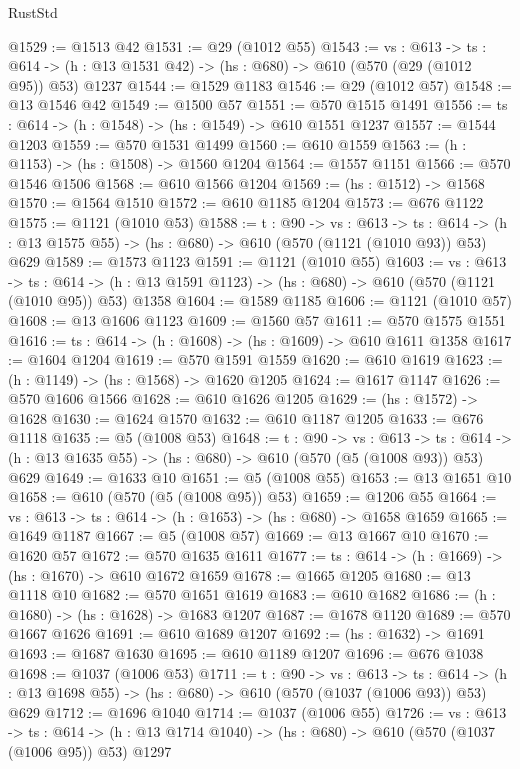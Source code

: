\begin{lexlean}{RustStd}
\begin{coremodule}
@1529 := @1513 @42
@1531 := @29 (@1012 @55)
@1543 := {vs : @613} ->
  {ts : @614} -> (h : @13 @1531 @42) -> (hs : @680) -> @610 (@570 (@29 (@1012 @95)) @53) @1237
@1544 := @1529 @1183
@1546 := @29 (@1012 @57)
@1548 := @13 @1546 @42
@1549 := @1500 @57
@1551 := @570 @1515 @1491
@1556 := {ts : @614} -> (h : @1548) -> (hs : @1549) -> @610 @1551 @1237
@1557 := @1544 @1203
@1559 := @570 @1531 @1499
@1560 := @610 @1559
@1563 := (h : @1153) -> (hs : @1508) -> @1560 @1204
@1564 := @1557 @1151
@1566 := @570 @1546 @1506
@1568 := @610 @1566 @1204
@1569 := (hs : @1512) -> @1568
@1570 := @1564 @1510
@1572 := @610 @1185 @1204
@1573 := @676 @1122
@1575 := @1121 (@1010 @53)
@1588 := {t : @90} ->
  {vs : @613} ->
  {ts : @614} -> (h : @13 @1575 @55) -> (hs : @680) -> @610 (@570 (@1121 (@1010 @93)) @53) @629
@1589 := @1573 @1123
@1591 := @1121 (@1010 @55)
@1603 := {vs : @613} ->
  {ts : @614} -> (h : @13 @1591 @1123) -> (hs : @680) -> @610 (@570 (@1121 (@1010 @95)) @53) @1358
@1604 := @1589 @1185
@1606 := @1121 (@1010 @57)
@1608 := @13 @1606 @1123
@1609 := @1560 @57
@1611 := @570 @1575 @1551
@1616 := {ts : @614} -> (h : @1608) -> (hs : @1609) -> @610 @1611 @1358
@1617 := @1604 @1204
@1619 := @570 @1591 @1559
@1620 := @610 @1619
@1623 := (h : @1149) -> (hs : @1568) -> @1620 @1205
@1624 := @1617 @1147
@1626 := @570 @1606 @1566
@1628 := @610 @1626 @1205
@1629 := (hs : @1572) -> @1628
@1630 := @1624 @1570
@1632 := @610 @1187 @1205
@1633 := @676 @1118
@1635 := @5 (@1008 @53)
@1648 := {t : @90} ->
  {vs : @613} ->
  {ts : @614} -> (h : @13 @1635 @55) -> (hs : @680) -> @610 (@570 (@5 (@1008 @93)) @53) @629
@1649 := @1633 @10
@1651 := @5 (@1008 @55)
@1653 := @13 @1651 @10
@1658 := @610 (@570 (@5 (@1008 @95)) @53)
@1659 := @1206 @55
@1664 := {vs : @613} -> {ts : @614} -> (h : @1653) -> (hs : @680) -> @1658 @1659
@1665 := @1649 @1187
@1667 := @5 (@1008 @57)
@1669 := @13 @1667 @10
@1670 := @1620 @57
@1672 := @570 @1635 @1611
@1677 := {ts : @614} -> (h : @1669) -> (hs : @1670) -> @610 @1672 @1659
@1678 := @1665 @1205
@1680 := @13 @1118 @10
@1682 := @570 @1651 @1619
@1683 := @610 @1682
@1686 := (h : @1680) -> (hs : @1628) -> @1683 @1207
@1687 := @1678 @1120
@1689 := @570 @1667 @1626
@1691 := @610 @1689 @1207
@1692 := (hs : @1632) -> @1691
@1693 := @1687 @1630
@1695 := @610 @1189 @1207
@1696 := @676 @1038
@1698 := @1037 (@1006 @53)
@1711 := {t : @90} ->
  {vs : @613} ->
  {ts : @614} -> (h : @13 @1698 @55) -> (hs : @680) -> @610 (@570 (@1037 (@1006 @93)) @53) @629
@1712 := @1696 @1040
@1714 := @1037 (@1006 @55)
@1726 := {vs : @613} ->
  {ts : @614} -> (h : @13 @1714 @1040) -> (hs : @680) -> @610 (@570 (@1037 (@1006 @95)) @53) @1297

\end{coremodule}
\end{lexlean}
